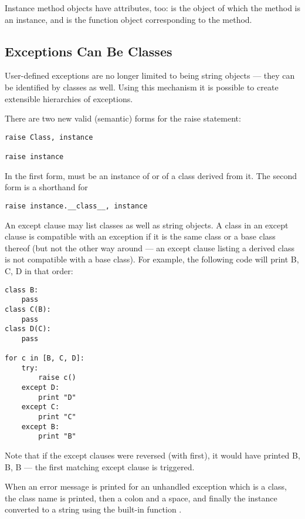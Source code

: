 \documentclass{manual}
\begin{document}
Instance method objects have attributes, too:  is the
object of which the method is an instance, and  is the
function object corresponding to the method.

\subsection{Exceptions Can Be Classes}
\label{exceptionClasses}

User-defined exceptions are no longer limited to being string objects
--- they can be identified by classes as well.  Using this mechanism it
is possible to create extensible hierarchies of exceptions.

There are two new valid (semantic) forms for the raise statement:

\begin{verbatim}
raise Class, instance

raise instance
\end{verbatim}

In the first form,  must be an instance of 
or of a class derived from it.  The second form is a shorthand for

\begin{verbatim}
raise instance.__class__, instance
\end{verbatim}

An except clause may list classes as well as string objects.  A class
in an except clause is compatible with an exception if it is the same
class or a base class thereof (but not the other way around --- an
except clause listing a derived class is not compatible with a base
class).  For example, the following code will print B, C, D in that
order:

\begin{verbatim}
class B:
    pass
class C(B):
    pass
class D(C):
    pass

for c in [B, C, D]:
    try:
        raise c()
    except D:
        print "D"
    except C:
        print "C"
    except B:
        print "B"
\end{verbatim}

Note that if the except clauses were reversed (with 
first), it would have printed B, B, B --- the first matching except
clause is triggered.

When an error message is printed for an unhandled exception which is a
class, the class name is printed, then a colon and a space, and
finally the instance converted to a string using the built-in function
.
\end{document}
